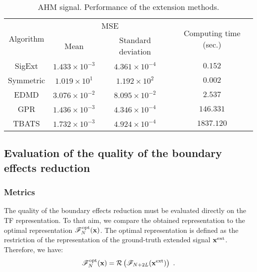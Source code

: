 \begin{table}
\centering
\caption{AHM signal. Performance of the extension methods.}
\begin{tabular}{|c||c|c|c|}
  \hline
   \multirow{2}{*}{Algorithm} & \multicolumn{2}{c|}{MSE}  & \multirow{2}{41pt}{Computing time (sec.)} \\
   \cline{2-3} & Mean & Standard deviation & \\
   \hhline{|=#=|=|=|}
   {\sf SigExt} & $1.433\times 10^{-3}$ & $4.361\times 10^{-4}$ & $0.152$ \\
   \hline
   Symmetric & $1.019\times 10^{1}$ & $1.192\times 10^{2}$ & $0.002$ \\
   \hline
   EDMD & $3.076\times 10^{-2}$ & $8.095\times 10^{-2}$ & $2.537$\\
   \hline
   GPR & $1.436\times 10^{-3}$ & $4.346\times 10^{-4}$ & $146.331$ \\
   \hline
   TBATS & $1.732\times 10^{-3}$ & $4.924\times 10^{-4}$ & $1837.120$ \\
   \hline
\end{tabular}
\label{tab:mse.sine}
\end{table} 


\subsection{Evaluation of the quality of the boundary effects reduction}

\subsubsection{Metrics}
The quality of the boundary effects reduction must be evaluated directly on the TF representation. To that aim, we compare the obtained representation to the optimal representation ${\mathscr F}_N^\mathrm{opt}({\mathbf x})$. The optimal representation is defined as the restriction of the representation of the ground-truth extended signal ${\mathbf x}^\mathrm{ext}$. Therefore, we have:
\begin{equation*}
{\mathscr F}_N^\mathrm{opt}({\mathbf x}) = {\mathcal R}\left( {\mathscr F}_{N+2L}({\mathbf x}^\mathrm{ext}) \right) \ .
\end{equation*} 

